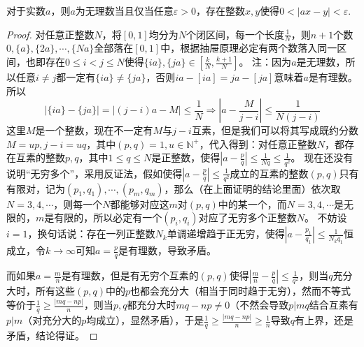 \documentclass[../../main.tex]{subfiles}
\begin{document}
\begin{corollary}
对于实数\(a\)，则\(a\)为无理数当且仅当任意\(\varepsilon>0\)，存在整数\(x,y\)使得\(0 < |ax - y| < \varepsilon\).
\end{corollary}
\begin{proof}
对任意正整数\(N\)，将\([0,1]\)均分为\(N\)个闭区间，每一个长度\(\frac{1}{N}\)，则\(n + 1\)个数\(0,\{a\},\{2a\},\cdots,\{Na\}\)全部落在\([0,1]\)中，根据抽屉原理必定有两个数落入同一区间，也即存在\(0\leq i < j\leq N\)使得\(\{ia\},\{ja\}\in\left[\frac{k}{N},\frac{k + 1}{N}\right]\)。
注：因为\(a\)是无理数，所以任意\(i\neq j\)都一定有\(\{ia\}\neq\{ja\}\)，否则\(ia - [ia]=ja - [ja]\)意味着\(a\)是有理数。
所以
\[|\{ia\} - \{ja\}|=|(j - i)a - M|\leq\frac{1}{N}\Rightarrow\left|a - \frac{M}{j - i}\right|\leq\frac{1}{N(j - i)}\]
这里\(M\)是一个整数，现在不一定有\(M\)与\(j - i\)互素，但是我们可以将其写成既约分数\(M = up,j - i = uq\)，其中\((p,q)=1,u\in\mathbb{N}^+\)，代入得到：对任意正整数\(N\)，都存在互素的整数\(p,q\)，其中\(1\leq q\leq N\)是正整数，使得\(\left|a - \frac{p}{q}\right|\leq\frac{1}{Nq}\leq\frac{1}{q^2}\)。
现在还没有说明“无穷多个”，采用反证法，假如使得\(\left|a - \frac{p}{q}\right|\leq\frac{1}{q^2}\)成立的互素的整数\((p,q)\)只有有限对，记为\((p_1,q_1),\cdots,(p_m,q_m)\)，那么（在上面证明的结论里面）依次取\(N = 3,4,\cdots\)，则每一个\(N\)都能够对应这\(m\)对\((p,q)\)中的某一个，而\(N = 3,4,\cdots\)是无限的，\(m\)是有限的，所以必定有一个\((p_i,q_i)\)对应了无穷多个正整数\(N\)。
不妨设\(i = 1\)，换句话说：存在一列正整数\(N_k\)单调递增趋于正无穷，使得\(\left|a - \frac{p_1}{q_1}\right|\leq\frac{1}{N_kq_1}\)恒成立，令\(k\to\infty\)可知\(a = \frac{p}{q}\)是有理数，导致矛盾。

而如果\(a=\frac{m}{n}\)是有理数，但是有无穷个互素的\((p,q)\)使得\(\left|\frac{m}{n}-\frac{p}{q}\right|\leq\frac{1}{q^2}\)，则当\(q\)充分大时，所有这些\((p,q)\)中的\(p\)也都会充分大（相当于同时趋于无穷），然而不等式等价于\(\frac{1}{q}\geq\frac{|mq - np|}{n}\)，则当\(p,q\)都充分大时\(mq - np\neq0\)（不然会导致\(p|mq\)结合互素有\(p|m\)（对充分大的\(p\)均成立），显然矛盾），于是\(\frac{1}{q}\geq\frac{|mq - np|}{n}\geq\frac{1}{n}\)导致\(q\)有上界，还是矛盾，结论得证。
\end{proof}
\end{document}
